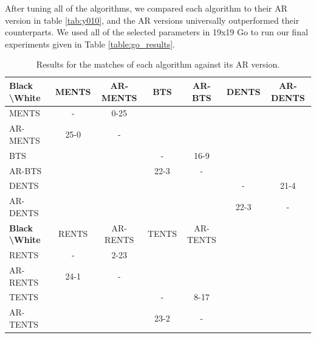 \documentclass{article}
\theoremstyle{plain}
\begin{document}
\begin{appendices}
            
            
            
            
            
            
            After tuning all of the algorithms, we compared each algorithm to their AR version in table \ref{tab:y010}, and the AR versions universally outperformed their counterparts. We used all of the selected parameters in 19x19 Go to run our final experiments given in Table \ref{table:go_results}.
            
            
            
            \begin{table}[]
            \centering
                \begin{tabular}{l|cccccc}
                    \textbf{Black \textbackslash White}     & MENTS     & AR-MENTS  & BTS       & AR-BTS    & DENTS     & AR-DENTS  \\ 
                    \hline
                                            MENTS           &   -       & 0-25      &           &           &           &           \\
                                            AR-MENTS        & 25-0      &   -       &           &           &           &           \\
                                            BTS             &           &           &   -       & 16-9      &           &           \\
                                            AR-BTS          &           &           & 22-3      &   -       &           &           \\
                                            DENTS           &           &           &           &           &   -       & 21-4      \\
                                            AR-DENTS        &           &           &           &           & 22-3      & -         \\      
                    \hline
                    \textbf{Black \textbackslash White}     & RENTS     & AR-RENTS  & TENTS     & AR-TENTS  &           &           \\ 
                    \hline
                                            RENTS           &   -       & 2-23      &           &           &           &           \\
                                            AR-RENTS        & 24-1      &   -       &           &           &           &           \\
                                            TENTS           &           &           &   -       & 8-17      &           &           \\
                                            AR-TENTS        &           &           & 23-2      & -         &           &           \\         
                \end{tabular}
                \caption{Results for the matches of each algorithm against its AR version.\label{tab:y10}}
            \end{table}
            

\end{appendices}
\end{document}

